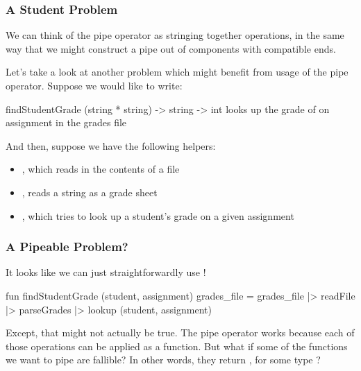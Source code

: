 \documentclass[aspectratio=169]{beamer}
\begin{document}
\begin{frame}[fragile]
  \frametitle{A Student Problem}

  We can think of the pipe operator as stringing together operations, in the same way
  that we might construct a pipe out of components with compatible ends.

  \pause
  \vspace{\fill}

  Let's take a look at another problem which might benefit from usage of the
  pipe operator. Suppose we would like to write:

  \pause
  \vspace{\fill}

  \spec
    {findStudentGrade}
    {(string * string) -> string -> int}
    {}
    { looks up the grade of 
    on assignment  in the grades file }

  \pause
  \vspace{\fill}

  And then, suppose we have the following helpers:
  \begin{itemize}
    \item {}, which reads in the contents of a file
    \item {}, reads a string as a grade sheet
    \item {}, which tries to look up a student's
    grade on a given assignment
  \end{itemize}
\end{frame}

\begin{frame}[fragile]
  \frametitle{A Pipeable Problem?}

  It looks like we can just straightforwardly use \code{|>}!

  \pause
  \vspace{\fill}

  \begin{codeblock}
    fun findStudentGrade (student, assignment) grades_file =
      grades_file
      |> readFile
      |> parseGrades
      |> lookup (student, assignment)
  \end{codeblock}

  \pause
  \vspace{\fill}

  Except, that might not actually be true. The pipe operator works because each
  of those operations can be applied as a function. But what if some of the
  functions we want to pipe are fallible? In other words, they return
  , for some type ?
\end{frame}
\end{document}
